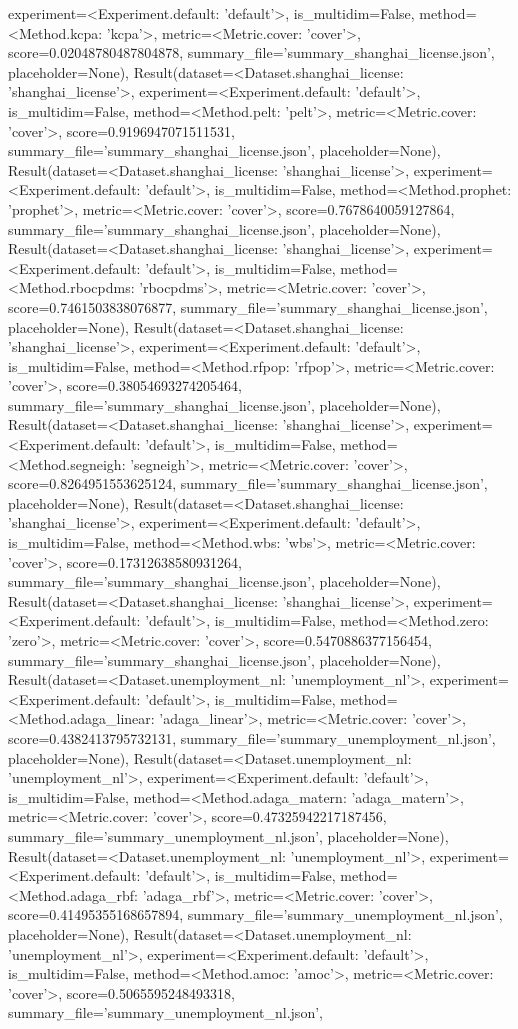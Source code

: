 experiment=<Experiment.default: 'default'>, is_multidim=False, method=<Method.kcpa: 'kcpa'>, metric=<Metric.cover: 'cover'>, score=0.02048780487804878, summary_file='summary_shanghai_license.json', placeholder=None), Result(dataset=<Dataset.shanghai_license: 'shanghai_license'>, experiment=<Experiment.default: 'default'>, is_multidim=False, method=<Method.pelt: 'pelt'>, metric=<Metric.cover: 'cover'>, score=0.9196947071511531, summary_file='summary_shanghai_license.json', placeholder=None), Result(dataset=<Dataset.shanghai_license: 'shanghai_license'>, experiment=<Experiment.default: 'default'>, is_multidim=False, method=<Method.prophet: 'prophet'>, metric=<Metric.cover: 'cover'>, score=0.7678640059127864, summary_file='summary_shanghai_license.json', placeholder=None), Result(dataset=<Dataset.shanghai_license: 'shanghai_license'>, experiment=<Experiment.default: 'default'>, is_multidim=False, method=<Method.rbocpdms: 'rbocpdms'>, metric=<Metric.cover: 'cover'>, score=0.7461503838076877, summary_file='summary_shanghai_license.json', placeholder=None), Result(dataset=<Dataset.shanghai_license: 'shanghai_license'>, experiment=<Experiment.default: 'default'>, is_multidim=False, method=<Method.rfpop: 'rfpop'>, metric=<Metric.cover: 'cover'>, score=0.38054693274205464, summary_file='summary_shanghai_license.json', placeholder=None), Result(dataset=<Dataset.shanghai_license: 'shanghai_license'>, experiment=<Experiment.default: 'default'>, is_multidim=False, method=<Method.segneigh: 'segneigh'>, metric=<Metric.cover: 'cover'>, score=0.8264951553625124, summary_file='summary_shanghai_license.json', placeholder=None), Result(dataset=<Dataset.shanghai_license: 'shanghai_license'>, experiment=<Experiment.default: 'default'>, is_multidim=False, method=<Method.wbs: 'wbs'>, metric=<Metric.cover: 'cover'>, score=0.17312638580931264, summary_file='summary_shanghai_license.json', placeholder=None), Result(dataset=<Dataset.shanghai_license: 'shanghai_license'>, experiment=<Experiment.default: 'default'>, is_multidim=False, method=<Method.zero: 'zero'>, metric=<Metric.cover: 'cover'>, score=0.5470886377156454, summary_file='summary_shanghai_license.json', placeholder=None), Result(dataset=<Dataset.unemployment_nl: 'unemployment_nl'>, experiment=<Experiment.default: 'default'>, is_multidim=False, method=<Method.adaga_linear: 'adaga_linear'>, metric=<Metric.cover: 'cover'>, score=0.4382413795732131, summary_file='summary_unemployment_nl.json', placeholder=None), Result(dataset=<Dataset.unemployment_nl: 'unemployment_nl'>, experiment=<Experiment.default: 'default'>, is_multidim=False, method=<Method.adaga_matern: 'adaga_matern'>, metric=<Metric.cover: 'cover'>, score=0.47325942217187456, summary_file='summary_unemployment_nl.json', placeholder=None), Result(dataset=<Dataset.unemployment_nl: 'unemployment_nl'>, experiment=<Experiment.default: 'default'>, is_multidim=False, method=<Method.adaga_rbf: 'adaga_rbf'>, metric=<Metric.cover: 'cover'>, score=0.41495355168657894, summary_file='summary_unemployment_nl.json', placeholder=None), Result(dataset=<Dataset.unemployment_nl: 'unemployment_nl'>, experiment=<Experiment.default: 'default'>, is_multidim=False, method=<Method.amoc: 'amoc'>, metric=<Metric.cover: 'cover'>, score=0.5065595248493318, summary_file='summary_unemployment_nl.json', 